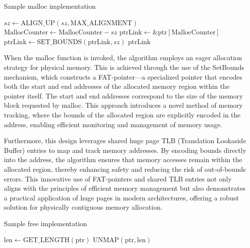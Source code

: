 \documentclass[11pt]{article}
\begin{document}
\begin{algorithm}
\caption{Sample malloc implementation}
\begin{algorithmic}[1]
    \State $sz \gets \text{ALIGN\_UP}(sz, \text{MAX\_ALIGNMENT})$ 
    \State $\text{MallocCounter} \gets \text{MallocCounter} - sz$ 
    \State $\text{ptrLink} \gets \&\text{ptr}[\text{MallocCounter}]$ 
    \State $\text{ptrLink} \gets \text{SET\_BOUNDS}(\text{ptrLink}, sz)$ 
    \State \Return $\text{ptrLink}$ 
\EndFunction
\end{algorithmic}
\end{algorithm}
When the malloc function is invoked, the algorithm employs an eager allocation strategy for physical memory. 
This is achieved through the use of the SetBounds mechanism, which constructs a FAT-pointer—a specialized 
pointer that encodes both the start and end addresses of the allocated memory region within the pointer 
itself. The start and end addresses correspond to the size of the memory block requested by malloc. This 
approach introduces a novel method of memory tracking, where the bounds of the allocated region are 
explicitly encoded in the address, enabling efficient monitoring and management of memory usage.

Furthermore, this design leverages shared huge page TLB (Translation Lookaside Buffer) entries to map 
and track memory addresses. By encoding bounds directly into the address, the algorithm ensures that memory 
accesses remain within the allocated region, thereby enhancing safety and reducing the risk of out-of-bounds 
errors. This innovative use of FAT-pointers and shared TLB entries not only aligns with the principles of 
efficient memory management but also demonstrates a practical application of huge pages in modern 
architectures, offering a robust solution for physically contiguous memory allocation.

\begin{algorithm}
\caption{Sample free implementation}
\begin{algorithmic}[1]
    \State $\text{len} \gets \text{GET\_LENGTH}(\text{ptr})$ 
    \State $\text{UNMAP}(\text{ptr}, \text{len})$ 
\EndFunction
\end{algorithmic}
\end{algorithm}
\end{document}
